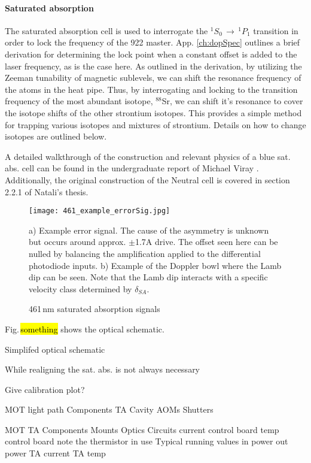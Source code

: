 \paragraph{Saturated absorption}
The saturated absorption cell is used to interrogate the $^1S_0\,\rightarrow\,^1P_1$ transition in order to lock the frequency of the 922 master.
App. \ref{ch:dopSpec} outlines a brief derivation for determining the lock point when a constant offset is added to the laser frequency, as is the case here.
As outlined in the derivation, by utilizing the Zeeman tunability of magnetic sublevels, we can shift the resonance frequency of the atoms in the heat pipe.
Thus, by interrogating and locking to the transition frequency of the most abundant isotope, $^{88}$Sr, we can shift it's resonance to cover the isotope shifts of the other strontium isotopes.
This provides a simple method for trapping various isotopes and mixtures of strontium.
Details on how to change isotopes are outlined below.

A detailed walkthrough of the construction and relevant physics of a blue sat. abs. cell can be found in the undergraduate report of Michael Viray \cite{MichaelViray2014}.
Additionally, the original construction of the Neutral cell is covered in section 2.2.1 of Natali's thesis.

	\begin{figure}
		\centerline{
		\texttt{[image: 461\_example\_errorSig.jpg]}}
		\caption{461\,nm saturated absorption signals}{a) Example error signal. The cause of the asymmetry is unknown but occurs around approx. $\pm$1.7A drive. The offset seen here can be nulled by balancing the amplification applied to the differential photodiode inputs. b) Example of the Doppler bowl where the Lamb dip can be seen. Note that the Lamb dip interacts with a specific velocity class determined by $\delta_{SA}$.}
		\label{fig:461zeemanBeam}
	\end{figure}

Fig.\,\hl{something} shows the optical schematic.



Simplifed optical schematic

While realigning the sat. abs. is not always necessary

Give calibration plot?

MOT light path
	Components
		TA
		Cavity
		AOMs
		Shutters
	
	MOT TA
		Components
			Mounts
			Optics
			Circuits
				current control board
				temp control board
					note the thermistor in use
		Typical running values
			in power
			out power
			TA current
			TA temp
		
